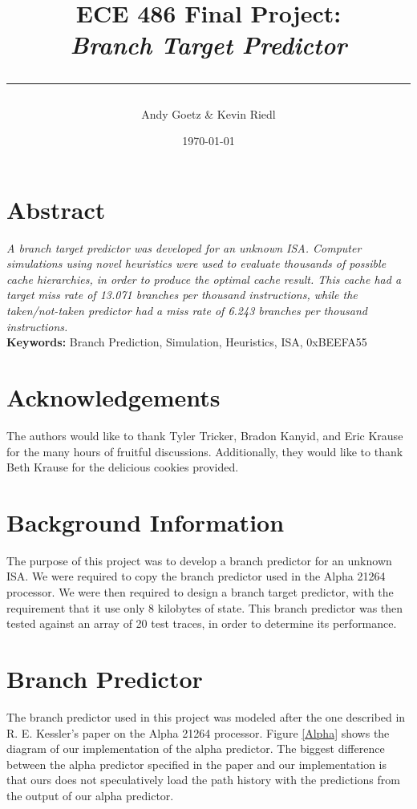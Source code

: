 \documentclass[twocolumn]{article}
\author{\LARGE Andy Goetz \& Kevin Riedl}
\date{\today}
\title{\Huge \textbf{ECE 486 Final Project:} \\ \it{Branch Target Predictor} \\ \rule{\linewidth}{0.5mm}}
\begin{document}
\maketitle
\section{Abstract}
\textit{ A branch target predictor was developed for an unknown
  ISA. Computer simulations using novel heuristics were used to
  evaluate thousands of possible cache hierarchies, in order to
  produce the optimal cache result. This cache had a target miss rate
  of 13.071 branches per thousand instructions, while the
  taken/not-taken predictor had a miss rate of 6.243 branches per
  thousand instructions.  }\\

\textbf{Keywords: } Branch Prediction, Simulation, Heuristics, ISA, 0xBEEFA55

\section{Acknowledgements}

The authors would like to thank Tyler Tricker, Bradon Kanyid, and Eric
Krause for the many hours of fruitful discussions. Additionally, they
would like to thank Beth Krause for the delicious cookies provided.

\section{Background Information}
The purpose of this project was to develop a branch predictor for an
unknown ISA. We were required to copy the branch predictor used in the
Alpha 21264 processor. We were then required to design a branch target
predictor, with the requirement that it use only 8 kilobytes of
state. This branch predictor was then tested against an array of 20
test traces, in order to determine its performance. 


\section{Branch Predictor}
The branch predictor used in this project was modeled after the one
described in R. E. Kessler's paper on the Alpha 21264
processor. Figure \ref{Alpha} shows the diagram of our implementation
of the alpha predictor. The biggest difference between the alpha
predictor specified in the paper and our implementation is that ours
does not speculatively load the path history with the predictions from
the output of our alpha predictor. 
\end{document}

